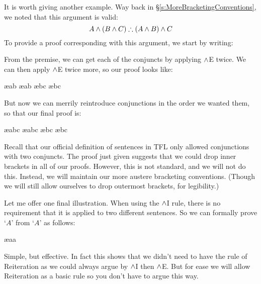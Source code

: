 It is worth giving another example. Way back in \S\ref{s:MoreBracketingConventions}, we noted that this argument is valid:
	$$A \eand (B \eand C) \therefore (A \eand B) \eand C$$
To provide a proof corresponding with this argument, we start by writing:
\begin{pf}
\end{pf}
From the premise, we can get each of the conjuncts by applying $\mathbin{\wedge}$E twice. We can then apply $\mathbin{\wedge}$E twice more, so our proof looks like:
\begin{pf}
	 \ae{ab}
	 \ae{ab}
	 \ae{bc}
	 \ae{bc}
\end{pf}
But now we can merrily reintroduce conjunctions in the order we wanted them, so that our final proof is:
\begin{pf}
	 \ae{abc}
	 \ae{abc}
	 \ae{bc}
	 \ae{bc}
\end{pf}
Recall that our official definition of sentences in TFL only allowed conjunctions with two conjuncts. The proof just given suggests that we could drop inner brackets in all of our proofs. However, this is not standard, and we will not do this. Instead, we will maintain our more austere bracketing conventions. (Though we will still allow ourselves to drop outermost brackets, for legibility.)

Let me offer one final illustration. When using the $\mathbin{\wedge}$I rule, there is no requirement that it is applied to two different sentences. So we can formally prove `$A$' from `$A$' as follows:
\begin{pf}
	\ae{aa}
\end{pf}
Simple, but effective. In fact this shows that we didn't need to have the rule of Reiteration as we could always argue by $\mathbin{\wedge}$I then $\mathbin{\wedge}$E. But for ease we will allow Reiteration as a basic rule so you don't have to argue this way.



